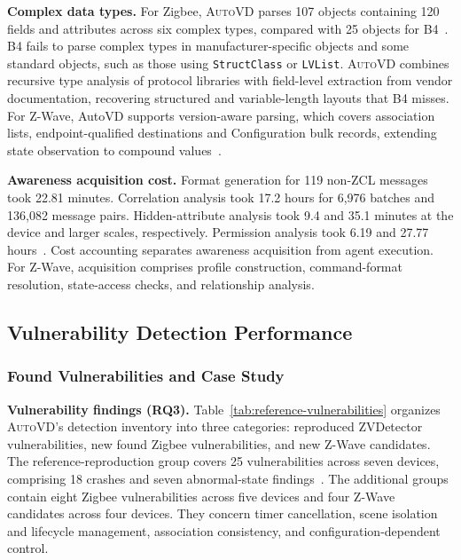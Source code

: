 \documentclass[10pt,journal,compsoc]{IEEEtran}
\newcommand{\system}{\textsc{AutoVD}}
\DeclareRobustCommand{\rq}[1]{\textcolor{rqcolor}{\textbf{RQ#1}}}
\newcommand{\parab}[1]{\vspace{0.04in}\noindent\textbf{#1}}
\begin{document}
\parab{Complex data types.}
For Zigbee, \system{} parses 107 objects containing 120 fields and attributes across six complex types, compared with 25 objects for B4~\cite{zvdetector}. B4 fails to parse complex types in manufacturer-specific objects and some standard objects, such as those using \texttt{StructClass} or \texttt{LVList}. \system{} combines recursive type analysis of protocol libraries with field-level extraction from vendor documentation, recovering structured and variable-length layouts that B4 misses. For Z-Wave, AutoVD supports version-aware parsing, which covers association lists, endpoint-qualified destinations and Configuration bulk records, extending state observation to compound values~\cite{zwavexml}.

\parab{Awareness acquisition cost.}
Format generation for 119 non-ZCL messages took 22.81 minutes. Correlation analysis took 17.2 hours for 6,976 batches and 136,082 message pairs. Hidden-attribute analysis took 9.4 and 35.1 minutes at the device and larger scales, respectively. Permission analysis took 6.19 and 27.77 hours~\cite{zvdetector}. Cost accounting separates awareness acquisition from agent execution. For Z-Wave, acquisition comprises profile construction, command-format resolution, state-access checks, and relationship analysis.

\subsection{Vulnerability Detection Performance}\label{sec:ablation}

\subsubsection{Found Vulnerabilities and Case Study}
\parab{Vulnerability findings (\rq{3}).}
Table~\ref{tab:reference-vulnerabilities} organizes \system{}'s detection inventory into three categories: reproduced ZVDetector vulnerabilities, new found Zigbee vulnerabilities, and new Z-Wave candidates. The reference-reproduction group covers 25 vulnerabilities across seven devices, comprising 18 crashes and seven abnormal-state findings~\cite{zvdetector}. The additional groups contain eight Zigbee vulnerabilities across five devices and four Z-Wave candidates across four devices. They concern timer cancellation, scene isolation and lifecycle management, association consistency, and configuration-dependent control. 
\end{document}
